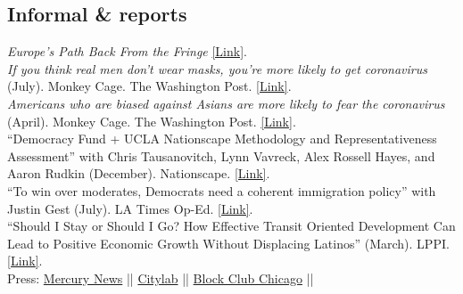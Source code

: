 \documentclass[11pt, a4paper]{article}
\newcommand{\years}[1]{\marginnote{\scriptsize #1}}
\begin{document}
\subsection*{Informal \& reports}

\years{2021}\textit{Europe's Path Back From the Fringe} \href{https://www.iri.org/sites/default/files/wysiwyg/europe_path_back_from_the_fringe.pdf}{[Link]}.\\
\years{2020}\textit{If you think real men don’t wear masks, you’re more likely to get coronavirus} (July). Monkey Cage. The Washington Post. \href{https://www.washingtonpost.com/politics/2020/07/16/if-you-think-real-men-dont-wear-masks-youre-more-likely-get-covid-19/?fbclid=IwAR3IeiNggNkKkUy3sIM2OYnG091YyoTZAIHJ9w6167TPCTRTghdG-_XYXio}{[Link]}.\\
\years{}\textit{Americans who are biased against Asians are more likely to fear the coronavirus} (April). Monkey Cage. The Washington Post. \href{https://www.washingtonpost.com/politics/2020/04/01/americans-who-are-biased-against-asians-are-more-likely-fear-coronavirus/}{[Link]}.\\
\years{2019} ``Democracy Fund + UCLA
Nationscape Methodology and Representativeness Assessment'' with Chris Tausanovitch, Lynn Vavreck, Alex Rossell Hayes, and Aaron Rudkin (December). Nationscape. \href{https://www.voterstudygroup.org/download?lv=R9WVD6NcOZQVNZoKZOIRbASygr6H4fSnrLZ158RPvbx17XUGELPaq0KolDijyiTyN205aY805eFc2jdEul4iEsakXrQ50jcWVze58Hkn1FW6gSjR6OGY3IlQbtx6e%252BLQv0KjZJFudeXzYDWxzy6DuUdGxT2zwj0q8BzOOCMb3R%252Bx0Nz%252FlTNV9hE%252Fl8MgnTER0JU1SoCrk3o2mWygPDFDQBAEZixF4SmfssUk9Sl62Gd26KlJIInDvQ1j%252BAql0lUR}{[Link]}.\\
\years{2018} ``To win over moderates, Democrats need a coherent immigration policy'' with Justin Gest (July). LA Times Op-Ed. \href{http://www.latimes.com/opinion/op-ed/la-oe-gest-reny-immigration-policy-democrats-20180720-story.html}{[Link]}.\\
\years{} ``Should I Stay or Should I Go? How Effective Transit Oriented Development Can Lead to Positive Economic Growth Without Displacing Latinos'' (March). LPPI. \href{http://latino.ucla.edu/}{[Link]}.\\
\indent Press: 
\indent \href{https://www.mercurynews.com/2018/03/29/development-without-gentrification-oaklands-fruitvale-is-the-model-report-says/}{Mercury News} || 
\indent \href{https://www.citylab.com/equity/2018/04/how-transit-oriented-development-can-prevent-displacement/556373/?utm_source=twb%3Futm_source%3Dfbb}{Citylab} || \indent \href{https://blockclubchicago.org/2018/11/12/can-chicagos-gentrifying-neighborhoods-grow-without-leaving-longtime-residents-behind-oaklands-fruitvale-village-offers-hope/}{Block Club Chicago} ||
\end{document}
